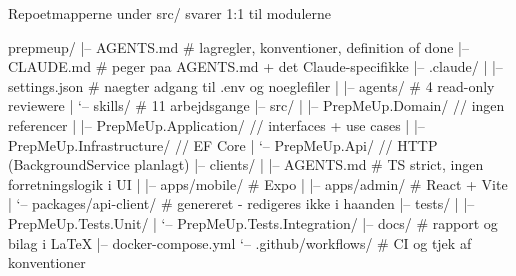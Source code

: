 \documentclass[aspectratio=169,10pt]{beamer}
\begin{document}
\begin{frame}[fragile]{Repoet}{mapperne under src/ svarer 1:1 til modulerne}
  \vspace{1mm}
\begin{semiverbatim}
\tiny\ttfamily
prepmeup/
|-- AGENTS.md                     \color{faint}# lagregler, konventioner, definition of done\color{deep}
|-- CLAUDE.md                     \color{faint}# peger paa AGENTS.md + det Claude-specifikke\color{deep}
|-- .claude/
|   |-- settings.json             \color{faint}# naegter adgang til .env og noeglefiler\color{deep}
|   |-- agents/                   \color{faint}# 4 read-only reviewere\color{deep}
|   `-- skills/                   \color{faint}# 11 arbejdsgange\color{deep}
|-- src/
|   |-- PrepMeUp.Domain/          \color{moss}// ingen referencer\color{deep}
|   |-- PrepMeUp.Application/     \color{moss}// interfaces + use cases\color{deep}
|   |-- PrepMeUp.Infrastructure/  \color{moss}// EF Core\color{deep}
|   `-- PrepMeUp.Api/             \color{moss}// HTTP (BackgroundService planlagt)\color{deep}
|-- clients/
|   |-- AGENTS.md                 \color{faint}# TS strict, ingen forretningslogik i UI\color{deep}
|   |-- apps/mobile/              \color{faint}# Expo\color{deep}
|   |-- apps/admin/               \color{faint}# React + Vite\color{deep}
|   `-- packages/api-client/      \color{faint}# genereret - redigeres ikke i haanden\color{deep}
|-- tests/
|   |-- PrepMeUp.Tests.Unit/
|   `-- PrepMeUp.Tests.Integration/
|-- docs/                         \color{faint}# rapport og bilag i LaTeX\color{deep}
|-- docker-compose.yml
`-- .github/workflows/            \color{faint}# CI og tjek af konventioner\color{deep}
\end{semiverbatim}
\end{frame}
\end{document}
